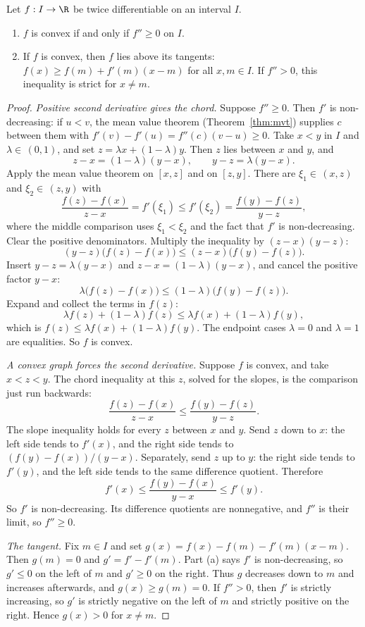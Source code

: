 \begin{proposition}\label{prop:convex}
Let $f:I\to\R$ be twice differentiable on an interval $I$.
\begin{enumerate}[label=(\alph*)]
\item $f$ is convex if and only if $f''\ge0$ on $I$.
\item If $f$ is convex, then $f$ lies above its tangents: $f(x)\ge f(m)+f'(m)(x-m)$ for all $x,m\in I$. If $f''>0$, this inequality is strict for $x\ne m$.
\end{enumerate}
\end{proposition}
\begin{proof}
\emph{Positive second derivative gives the chord.} Suppose $f''\ge0$. Then $f'$ is non-decreasing: if $u<v$, the mean value theorem (Theorem~\ref{thm:mvt}) supplies $c$ between them with $f'(v)-f'(u)=f''(c)(v-u)\ge0$. Take $x<y$ in $I$ and $\lambda\in\,(0,1)$, and set $z=\lambda x+(1-\lambda)y$. Then $z$ lies between $x$ and $y$, and
\[
z-x=(1-\lambda)(y-x),\qquad y-z=\lambda(y-x).
\]
Apply the mean value theorem on $[x,z]$ and on $[z,y]$. There are $\xi_1\in\,(x,z)$ and $\xi_2\in\,(z,y)$ with
\[
\frac{f(z)-f(x)}{z-x}=f'(\xi_1)\le f'(\xi_2)=\frac{f(y)-f(z)}{y-z},
\]
where the middle comparison uses $\xi_1<\xi_2$ and the fact that $f'$ is non-decreasing. Clear the positive denominators. Multiply the inequality by $(z-x)(y-z)$:
\[
(y-z)\bigl(f(z)-f(x)\bigr)\le(z-x)\bigl(f(y)-f(z)\bigr).
\]
Insert $y-z=\lambda(y-x)$ and $z-x=(1-\lambda)(y-x)$, and cancel the positive factor $y-x$:
\[
\lambda\bigl(f(z)-f(x)\bigr)\le(1-\lambda)\bigl(f(y)-f(z)\bigr).
\]
Expand and collect the terms in $f(z)$:
\[
\lambda f(z)+(1-\lambda)f(z)\le\lambda f(x)+(1-\lambda)f(y),
\]
which is $f(z)\le\lambda f(x)+(1-\lambda)f(y)$. The endpoint cases $\lambda=0$ and $\lambda=1$ are equalities. So $f$ is convex.

\emph{A convex graph forces the second derivative.} Suppose $f$ is convex, and take $x<z<y$. The chord inequality at this $z$, solved for the slopes, is the comparison just run backwards:
\[
\frac{f(z)-f(x)}{z-x}\le\frac{f(y)-f(z)}{y-z}.
\]
The slope inequality holds for every $z$ between $x$ and $y$. Send $z$ down to $x$: the left side tends to $f'(x)$, and the right side tends to $(f(y)-f(x))/(y-x)$. Separately, send $z$ up to $y$: the right side tends to $f'(y)$, and the left side tends to the same difference quotient. Therefore
\[
f'(x)\le\frac{f(y)-f(x)}{y-x}\le f'(y).
\]
So $f'$ is non-decreasing. Its difference quotients are nonnegative, and $f''$ is their limit, so $f''\ge0$.

\emph{The tangent.} Fix $m\in I$ and set $g(x)=f(x)-f(m)-f'(m)(x-m)$. Then $g(m)=0$ and $g'=f'-f'(m)$. Part (a) says $f'$ is non-decreasing, so $g'\le0$ on the left of $m$ and $g'\ge0$ on the right. Thus $g$ decreases down to $m$ and increases afterwards, and $g(x)\ge g(m)=0$. If $f''>0$, then $f'$ is strictly increasing, so $g'$ is strictly negative on the left of $m$ and strictly positive on the right. Hence $g(x)>0$ for $x\ne m$.
\end{proof}

